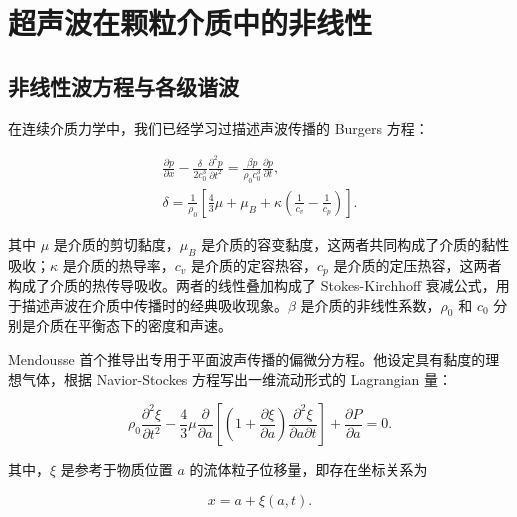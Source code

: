 \section{超声波在颗粒介质中的非线性}


\subsection{非线性波方程与各级谐波}

在连续介质力学中，我们已经学习过描述声波传播的 Burgers 方程：

\begin{align}
  \frac{\partial p}{\partial x} - \frac{\delta}{2c_{0}^{3}}\frac{\partial^{2}p}{\partial t^{2}} = \frac{\beta p}{\rho_{0}c_{0}^{3}}\frac{\partial p}{\partial t},\label{eq:burgers_equation_1}\\
  \delta = \frac{1}{\rho_{0}}\left[\frac{4}{3}\mu + \mu_{B} + \kappa\left(\frac{1}{c_{v}} - \frac{1}{c_{p}}\right)\right].
\end{align}

其中 $\mu$ 是介质的剪切黏度，$\mu_{B}$ 是介质的容变黏度，这两者共同构成了介质的黏性吸收；$\kappa$ 是介质的热导率，$c_{v}$ 是介质的定容热容，$c_{p}$ 是介质的定压热容，这两者构成了介质的热传导吸收。两者的线性叠加构成了 Stokes-Kirchhoff 衰减公式，用于描述声波在介质中传播时的经典吸收现象。$\beta$ 是介质的非线性系数，$\rho_{0}$ 和 $c_{0}$ 分别是介质在平衡态下的密度和声速。

Mendousse 首个推导出专用于平面波声传播的偏微分方程。他设定具有黏度的理想气体，根据 Navior-Stockes 方程写出一维流动形式的 Lagrangian 量：

\begin{equation}
  \rho_{0}\frac{\partial^{2}\xi}{\partial t^{2}} - \frac{4}{3}\mu\frac{\partial }{\partial a}\left[\left(1 + \frac{\partial\xi}{\partial a}\right)\frac{\partial^{2}\xi}{\partial a\partial t}\right] + \frac{\partial P}{\partial a} = 0.\label{eq:mendousse_equation}
\end{equation}

其中，$\xi$ 是参考于物质位置 $a$ 的流体粒子位移量，即存在坐标关系为

\begin{equation}
  x = a + \xi(a,t).
\end{equation}

